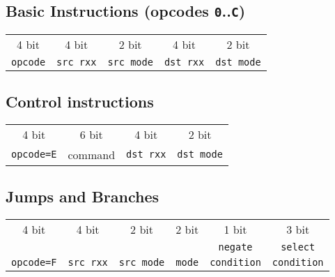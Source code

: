 \documentclass{leaflet}
\begin{document}
  \subsection{Basic Instructions (opcodes \texttt{0}..\texttt{C})}
   \begin{center}
    \begin{longtable}{|c||c|c||c|c|}
     \hline
     4 bit&4 bit&2 bit&4 bit&2 bit\\
     {\tt opcode}&{\tt src rxx}&{\tt src mode}&
     {\tt dst rxx}&{\tt dst mode}\\
     \hline
    \end{longtable}
   \end{center}
  \vspace*{-14mm}
%
  \subsection{Control instructions}
    \begin{center}
     \begin{longtable}{|c||c||c|c|}
      \hline
      4 bit&6 bit&4 bit&2 bit\\
      {\tt opcode=E}&command&\texttt{dst rxx}&\texttt{dst mode}\\
      \hline
     \end{longtable}
    \end{center}
   \vspace*{-13mm}
%
  \subsection{Jumps and Branches}
   {\scriptsize
    \begin{center}
     \begin{longtable}{|c||c|c||c||c|c|}
      \hline
      4 bit&4 bit&2 bit&2 bit&1 bit&3 bit\\
      &     &     &     &{\tt negate}&{\tt select}\\
      {\tt opcode=F}&{\tt src rxx}&{\tt src mode}&
      {\tt mode}&{\tt condition}&{\tt condition}\\
      \hline
     \end{longtable}
    \end{center}
   }
   \vspace*{-13mm}
%
\end{document}
